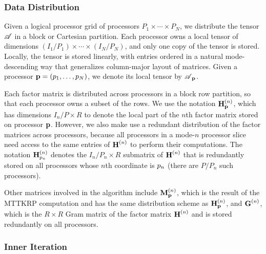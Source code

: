 \subsubsection{Data Distribution}
\label{sec:datadist}

Given a logical processor grid of processors $P_1\times \cdots \times P_N$, we distribute the tensor $\TA$ in a block or Cartesian partition.
Each processor owns a local tensor of dimensions $(I_1/P_1)\times \cdots \times (I_N/P_N)$, and only one copy of the tensor is stored.
Locally, the tensor is stored linearly, with entries ordered in a natural mode-descending way that generalizes column-major layout of matrices.
Given a processor $\V{p}=(\VE{p}{1},\dots,\VE{p}{N})$, we denote its local tensor by $\TA_{\V{p}}$.

Each factor matrix is distributed across processors in a block row partition, so that each processor owns a subset of the rows.
We use the notation $\Mn{H}{n}_{\V{p}}$, which has dimensions $I_n/P\times R$ to denote the local part of the $n$th factor matrix stored on processor $\V{p}$.
However, we also make use a redundant distribution of the factor matrices across processors, because all processors in a mode-$n$ processor slice need access to the same entries of $\Mn{H}{n}$ to perform their computations.
The notation $\Mn{H}{n}_{\VE{p}{n}}$ denotes the $I_n/P_n\times R$ submatrix of $\Mn{H}{n}$ that is redundantly stored on all processors whose $n$th coordinate is $\VE{p}{n}$ (there are $P/P_n$ such processors).

Other matrices involved in the algorithm include $\Mn{M}{n}_{\V{p}}$, which is the result of the MTTKRP computation and has the same distribution scheme as $\Mn{H}{n}_{\V{p}}$, and $\Mn{G}{n}$, which is the $R\times R$ Gram matrix of the factor matrix $\Mn{H}{n}$ and is stored redundantly on all processors.

\subsubsection{Inner Iteration}

